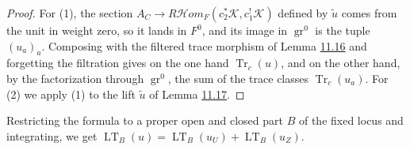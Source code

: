 \documentclass[11pt]{article}
\providecommand{\cHom}{}\renewcommand{\cHom}{R\mathcal{H}\!om}
\begin{document}
\begin{proof}[{Proof}]\label{bp55}%
For (1), the section \(A_C\to\cHom_F(c_2^*\mathcal K,c_1^!\mathcal K)\) defined by \(\tilde u\) comes from the unit in weight zero, so it lands in \(F^0\), and its image in \(\operatorname{gr}^0\) is the tuple \((u_a)_a\). Composing with the filtered trace morphism of Lemma \hyperref[bp45]{11.16} and forgetting the filtration gives on the one hand \(\operatorname{Tr}_c(u)\), and on the other hand, by the factorization through \(\operatorname{gr}^0\), the sum of the trace classes \(\operatorname{Tr}_c(u_a)\). For (2) we apply (1) to the lift \(\tilde u\) of Lemma \hyperref[bp48]{11.17}.
\end{proof}

\label{bp56}%
Restricting the formula to a proper open and closed part \(B\) of the fixed locus and integrating, we get \(\operatorname{LT}_B(u)=\operatorname{LT}_B(u_U)+\operatorname{LT}_B(u_Z)\).



\clearpage{}\hypertarget{bp-outside}{}%
\end{document}
